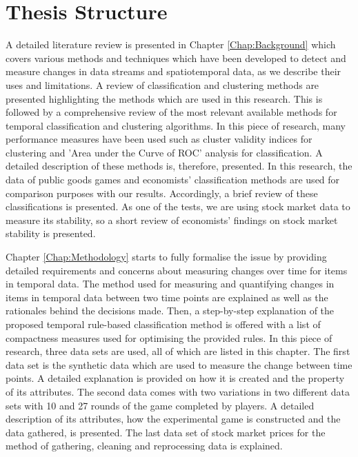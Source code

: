 \section{Thesis Structure}

A detailed literature review is presented in Chapter \ref{Chap:Background} which covers various methods and techniques which have been developed to detect and measure changes in data streams and spatiotemporal data, as we describe their uses and limitations. A review of classification and clustering methods are presented highlighting the methods which are used in this research. This is followed by a comprehensive review of the most relevant available methods for temporal classification and clustering algorithms. In this piece of research, many performance measures have been used such as cluster validity indices for clustering and 'Area under the Curve of ROC' analysis for classification.  A detailed description of these methods is, therefore, presented. In this research, the data of public goods games and economists' classification methods are used for comparison purposes with our results. Accordingly,  a brief review of these classifications is presented. As one of the tests, we are using stock market data to measure its stability, so a short review of economists' findings on stock market stability is presented.


Chapter \ref{Chap:Methodology} starts to fully formalise the issue by providing detailed requirements and concerns about measuring changes over time for items in temporal data. The method used for measuring and quantifying changes in items in temporal data between two time points are explained as well as the rationales behind the decisions made. Then, a step-by-step explanation of the proposed temporal rule-based classification method is offered with a list of compactness measures used for optimising the provided rules. In this piece of research, three data sets are used, all of which are listed in this chapter. The first data set is the synthetic data which are used to measure the change between time points. A detailed explanation is provided on how it is created and the property of its attributes. The second data comes with two variations in two different data sets with 10 and 27 rounds of the game completed by players. A detailed description of its attributes, how the experimental game is constructed and the data gathered, is presented. The last data set of stock market prices for the method of gathering, cleaning and reprocessing data is explained.

